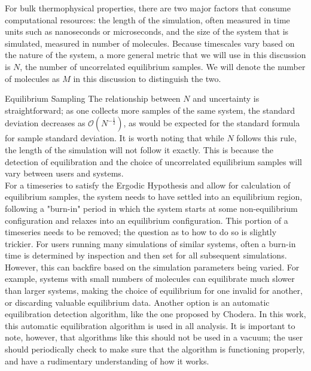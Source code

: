 \documentclass[aps,pre,twocolumn,nofootinbib,superscriptaddress,linenumbers,10pt, draft,tightenlines]{revtex4-1}
\begin{document}
For bulk thermophysical properties, there are two major factors that consume computational resources: the length of the simulation, often measured in time units such as nanoseconds or microseconds, and the size of the system that is simulated, measured in number of molecules.  Because timescales vary based on the nature of the system, a more general metric that we will use in this discussion is $N$, the number of uncorrelated equilibrium samples. We will denote the number of molecules as $M$ in this discussion to distinguish the two.
\begin{subsubsection}{Equilibrium Sampling}
The relationship between $N$ and uncertainty is straightforward; as one collects more samples of the same system, the standard deviation decreases as $\mathcal{O} (N^{-\frac{1}{2}})$, as would be expected for the standard formula for sample standard deviation.  It is worth noting that while $N$ follows this rule, the length of the simulation will not follow it exactly.  This is because the detection of equilibration and the choice of uncorrelated equilibrium samples will vary between users and systems.  
\\
For a timeseries to satisfy the Ergodic Hypothesis and allow for calculation of equilibrium samples, the system needs to have settled into an equilibrium region, following a "burn-in" period in which the system starts at some non-equilibrium configuration and relaxes into an equilibrium configuration.  This portion of a timeseries needs to be removed; the question as to how to do so is slightly trickier.  For users running many simulations of similar systems, often a burn-in time is determined by inspection and then set for all subsequent simulations. However, this can backfire based on the simulation parameters being varied.  For example, systems with small numbers of molecules can equilibrate much slower than larger systems, making the choice of equilibrium for one invalid for another, or discarding valuable equilibrium data.  Another option is an automatic equilibration detection algorithm, like the one proposed by Chodera. %
In this work, this automatic equilibration algorithm is used in all analysis.  It is important to note, however, that algorithms like this should not be used in a vacuum;  the user should periodically check to make sure that the algorithm is functioning properly, and have a rudimentary understanding of how it works.


\end{subsubsection}
\end{document}

